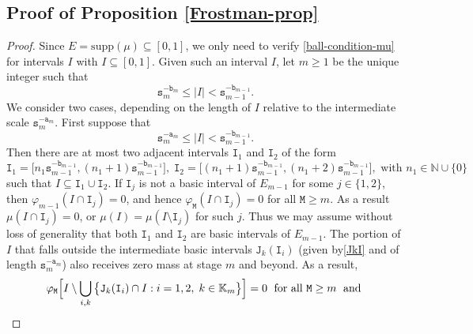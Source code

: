 \documentclass[12pt, twoside]{article}
\theoremstyle{definition}
\numberwithin{equation}{section}
\begin{document}
\subsection{Proof of Proposition \ref{Frostman-prop}} \label{Frostman-prop-proof-section} 
\begin{proof} 
	Since $E = \text{supp}(\mu) \subseteq [0,1]$, we only need to verify \eqref{ball-condition-mu} for intervals $I$ with $I \subseteq  [0,1]$. Given such an interval $I$, let $m \geq 1$ be the unique integer such that 
	\begin{equation} \mathtt s_m^{-\mathtt b_m} \leq |I| < \mathtt s_{m-1}^{-\mathtt b_{m-1}}. \label{I-size} \end{equation}
	We consider two cases, depending on the length of $I$ relative to the intermediate scale $\mathtt s_m^{-\mathtt a_m}$. 
	\vskip0.1in 
	 First suppose that 
	\begin{equation} 
		\mathtt s_m^{-\mathtt a_m} \leq |I| < \mathtt s_{m-1}^{-\mathtt b_{m-1}}. \label{case-1-assumption} 
	\end{equation} 
	Then there are at most two adjacent intervals 
	$\mathtt I_1$ and $\mathtt I_2$ of the form  
	\[ \mathtt I_1 = \bigl[n_1 \mathtt s_{m-1}^{-\mathtt b_{m-1}}, (n_1+1) \mathtt s_{m-1}^{-\mathtt b_{m-1}} \bigr], \; 
	\mathtt I_2 = \bigl[(n_1+1) \mathtt s_{m-1}^{-\mathtt b_{m-1}}, (n_1+2) \mathtt s_{m-1}^{-\mathtt b_{m-1}} \bigr], \text{ with } n_1 \in \mathbb N \cup \{0\}\] such that $I \subseteq \mathtt I_1 \cup \mathtt I_2$. If $\mathtt I_j$ is not a basic interval of $E_{m-1}$ for some $j \in \{1, 2\}$, then $\varphi_{m-1}(I \cap \mathtt I_j) = 0$, and hence $\varphi_{\mathtt M}(I \cap \mathtt I_j) = 0$ for all $\mathtt M \geq m$. As a result $\mu(I \cap \mathtt I_j) =0$, or $\mu(I) = \mu(I \setminus \mathtt I_j)$ for such $j$. Thus we may assume without loss of generality that both $\mathtt I_1$ and $\mathtt I_2$ are basic intervals of $E_{m-1}$.  The portion of $I$ that falls outside the intermediate basic intervals $\mathtt J_k(\mathtt I_i)$ (given by\eqref{JkI} and of length $\mathtt s_m^{-\mathtt a_m}$) also receives zero mass at stage $m$ and beyond. As a result,  
	\begin{align*} 
		&\varphi_{\mathtt M}\Bigl[I \setminus \bigcup_{i, k} \big\{\mathtt J_k(\mathtt I_i) \cap I :  i = 1, 2 ,\; {k \in \mathbb K_m } \bigr\}\Bigr] = 0 \; \text{ for all } \mathtt M \geq m \; \text{ and } \\

\end{align*}
\end{proof}
\end{document}
